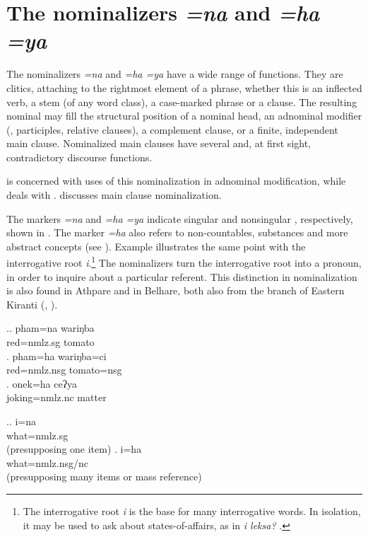  
\section{The nominalizers \emph{=na} and \emph{=ha \ti =ya} }\label{nmlz-uni}

  
The nominalizers \emph{=na} and \emph{=ha \ti =ya}  have a wide range of functions. They are clitics, attaching to the rightmost element of a phrase, whether this is an inflected verb, a stem (of any word class), a case-marked phrase or a clause. The resulting nominal may  fill the structural position of a nominal head, an adnominal modifier (, participles, relative clauses), a complement clause, or a finite,  independent  main clause. Nominalized main clauses have several and, at first sight, contradictory discourse functions.

 is concerned with uses of this nominalization in adnominal modification, while  deals with .  discusses main clause nominalization.


The markers \emph{=na} and \emph{=ha \ti =ya} indicate singular and nonsingular , respectively, shown in \Next. The marker \emph{=ha} also refers to non-countables, substances and more abstract concepts (see \Next[c]). Example \NNext illustrates the same point with the interrogative root \emph{i}.\footnote{The interrogative root \emph{i} is the base for many interrogative words. In isolation, it may be used to ask about states-of-affairs, as in  \emph{i leksa?} .} The nominalizers turn the interrogative root into a pronoun, in order to inquire about a particular referent. This  distinction in nominalization is also found in Athpare and in Belhare, both also from the  branch of Eastern Kiranti (\citealt[130]{Ebert1997A-grammar}, \citealt[278]{Bickel1999Nominalization}).


\ex.\ag. pham=na wariŋba\\
red{\sc =nmlz.sg} tomato\\
\bg. pham=ha wariŋba=ci\\
red{\sc =nmlz.nsg} tomato{\sc =nsg}\\
\bg. onek=ha ceʔya\\
joking{\sc =nmlz.nc} matter\\

\ex.\ag. i=na\\
what{\sc =nmlz.sg}\\
 (presupposing one item)
\bg. i=ha\\
what{\sc =nmlz.nsg/nc}\\
 (presupposing many items or mass reference)


